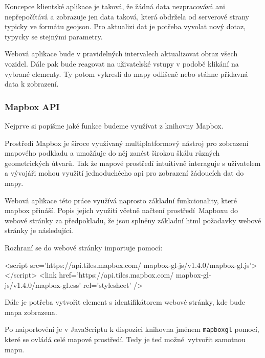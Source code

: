 \bigbreak

Koncepce klientské aplikace je taková, že žádná data nezpracovává ani nepřepočítává a zobrazuje jen data taková, která obdržela od serverové strany typicky ve formátu \gls{geojson}. Pro aktualizi dat je potřeba vyvolat nový dotaz, typycky se stejnými parametry.

\bigbreak

Webová aplikace bude v pravidelných intervalech aktualizovat obraz všech vozidel. Dále pak bude reagovat na uživatelské vstupy v podobě klikání na vybrané elementy. Ty potom vykreslí do mapy odlišeně nebo stáhne přídavná data k zobrazení.

\subsubsection{Mapbox API}

Nejprve si popišme jaké funkce budeme využívat z knihovny Mapbox.

\bigbreak

Prostředí Mapbox je široce využívaný multiplatformový nástroj pro zobrazení mapového podkladu a umožňuje do něj zanést širokou škálu různých geometrických útvarů. Tak že mapové prostředí intuitivně interaguje s uživatelem a vývojáři mohou využití jednoduchécho \gls{api} pro zobrazení žádoucích dat do mapy.

\bigbreak

Webová aplikace této práce využívá naprosto základní funkcionality, které mapbox přináší. Popis jejich využití včetně načtení prostředí Mapboxu do webové stránky za předpokladu, že jsou splněny základní \gls{html} požadavky webové stránky je následující.

\bigbreak

Rozhraní se do webové stránky importuje pomocí:

\begin{code}[frame=none]
<script src='https://api.tiles.mapbox.com/
  mapbox-gl-js/v1.4.0/mapbox-gl.js'></script>
<link href='https://api.tiles.mapbox.com/
  mapbox-gl-js/v1.4.0/mapbox-gl.css' rel='stylesheet' />
\end{code}

\bigbreak

Dále je potřeba vytvořit element s identifikátorem webové stránky, kde bude mapa zobrazena.

\bigbreak

Po naiportovéní je v JavaScriptu k dispozici knihovna jménem \verb-mapboxgl- pomocí, které se ovládá celé mapové prostředí. Tedy je teď možné vytvořit samotnou mapu.

